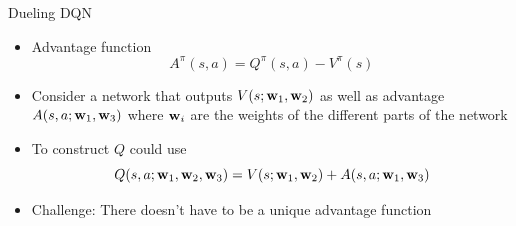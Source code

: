 \documentclass[aspectratio=169]{../latex_main/tntbeamer}  %
\begin{document}
\begin{frame}[c]{Dueling DQN~}
	
	\begin{itemize}
	\item Advantage function \\
	$$A^\pi (s,a) = Q^\pi(s,a) - V^\pi(s) $$
	\item Consider a network that outputs $V(s; \mathbf{w}_1, \mathbf{w}_2)$ as well as advantage $A(s,a; \mathbf{w}_1, \mathbf{w}_3)$ where $\mathbf{w}_i$ are the weights of the different parts of the network
	\item To construct $Q$ could use\\ $$Q(s,a;\mathbf{w}_1, \mathbf{w}_2, \mathbf{w}_3) = V(s;\mathbf{w}_1, \mathbf{w}_2) + A(s,a;\mathbf{w}_1, \mathbf{w}_3)$$
	\bigskip
	\pause
	\item Challenge: There doesn't have to be a unique advantage function

	\end{itemize}
	
\end{frame}
\end{document}
